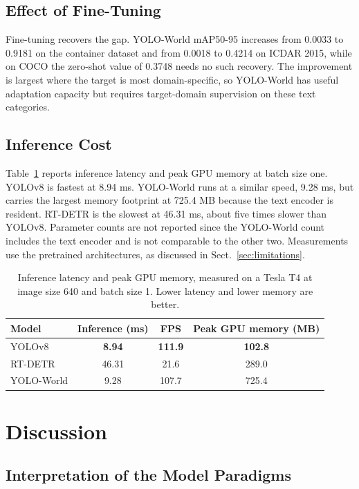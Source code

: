 \documentclass[conference]{IEEEtran}
\begin{document}
\subsection{Effect of Fine-Tuning}

Fine-tuning recovers the gap. YOLO-World mAP50-95 increases from 0.0033 to 0.9181 on the container dataset and from 0.0018 to 0.4214 on ICDAR 2015, while on COCO the zero-shot value of 0.3748 needs no such recovery. The improvement is largest where the target is most domain-specific, so YOLO-World has useful adaptation capacity but requires target-domain supervision on these text categories.

\subsection{Inference Cost}

Table~\ref{tab:latency} reports inference latency and peak GPU memory at batch size one. YOLOv8 is fastest at 8.94 ms. YOLO-World runs at a similar speed, 9.28 ms, but carries the largest memory footprint at 725.4 MB because the text encoder is resident. RT-DETR is the slowest at 46.31 ms, about five times slower than YOLOv8. Parameter counts are not reported since the YOLO-World count includes the text encoder and is not comparable to the other two. Measurements use the pretrained architectures, as discussed in Sect.~\ref{sec:limitations}.

\begin{table}[tb]
\centering
\caption{Inference latency and peak GPU memory, measured on a Tesla T4 at image size 640 and batch size 1. Lower latency and lower memory are better.}
\label{tab:latency}
\begin{tabular}{lccc}
\toprule
Model & Inference (ms) & FPS & Peak GPU memory (MB) \\
\midrule
YOLOv8 & \textbf{8.94} & \textbf{111.9} & \textbf{102.8} \\
RT-DETR & 46.31 & 21.6 & 289.0 \\
YOLO-World & 9.28 & 107.7 & 725.4 \\
\bottomrule
\end{tabular}
\end{table}

\section{Discussion}

\subsection{Interpretation of the Model Paradigms}
\end{document}
